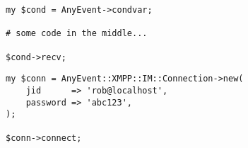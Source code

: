 \begin{shaded}
\begin{verbatim}
my $cond = AnyEvent->condvar;

# some code in the middle...

$cond->recv;
\end{verbatim}
\end{shaded}

\begin{comment}
This is how you run an AnyEvent event loop.  If you're not familiar with AnyEvent, I suggest you read up on it; however, intimate knowledge of it is not necessary for this tutorial.
\end{comment}

\newpage
\begin{shaded}
\begin{verbatim}
my $conn = AnyEvent::XMPP::IM::Connection->new(
    jid      => 'rob@localhost',
    password => 'abc123',
);

$conn->connect;
\end{verbatim}
\end{shaded}

\begin{comment}
Creates a connection object and connects when the event loop starts running.
Authenticates as rob@localhost, using the password 'abc123'.
\end{comment}
